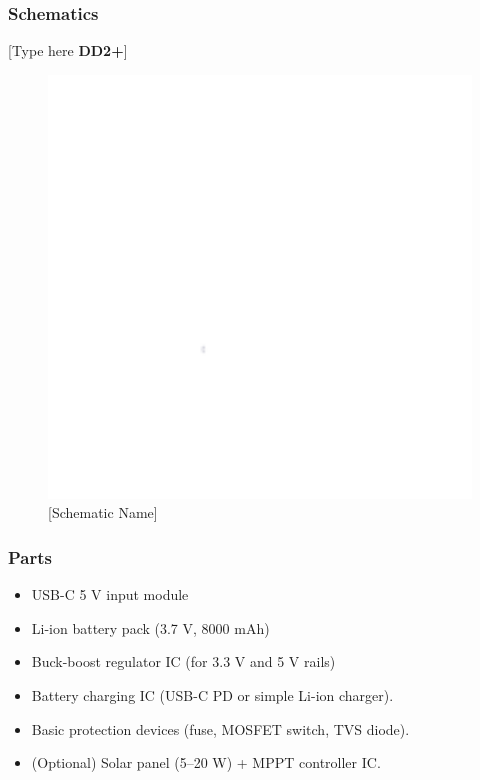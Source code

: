 \subsubsection{Schematics}
[Type here \textbf{DD2+}]
\begin{figure}[h]
    \centering
    \includegraphics[width=16cm]{images/white.png} %
    \caption{[Schematic Name]}
\end{figure} %

\subsubsection{Parts}
\begin{itemize}
    \item USB-C 5 V input module
    \item Li-ion battery pack (3.7 V, 8000 mAh)
    \item Buck-boost regulator IC (for 3.3 V and 5 V rails)
    \item Battery charging IC (USB-C PD or simple Li-ion charger).
    \item Basic protection devices (fuse, MOSFET switch, TVS diode).
    \item (Optional) Solar panel (5–20 W) + MPPT controller IC.
\end{itemize}
